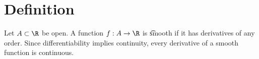 

\section*{Definition}

Let $A \subset \R $ be open.
A function $f: A \to \R $ is \t{smooth} if it has derivatives of any order.
Since differentiability implies continuity, every derivative of a smooth function is continuous.

\blankpage